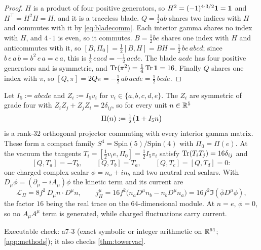 \begin{proof}
$H$ is a product of four positive generators, so $H^2=(-1)^{4\cdot3/2}\mathbf 1=\mathbf 1$ and $H^{\!\top}=H^2H=H$, and it is a traceless blade. $Q=\tfrac12ab$ shares two indices with
$H$ and commutes with it by \eqref{eq:bladecomm}. Each interior gamma shares no index with $H$, and $4\cdot1$ is even, so it commutes. $B=\tfrac12be$ shares one index with
$H$ and anticommutes with it, so $[B,\Pi_0]=\tfrac12[B,H]=BH=\tfrac12\,be\,abcd$; since $b\,e\,a\,b=b^2\,e\,a=e\,a$, this is $\tfrac12\,eacd=-\tfrac12\,acde$. The
blade $acde$ has four positive generators and is symmetric, and $\operatorname{Tr}(\pi^2)=\tfrac14\operatorname{Tr}\mathbf 1=16$. Finally $Q$ shares one index with $\pi$, so
$[Q,\pi]=2Q\pi=-\tfrac12\,ab\,acde=\tfrac12\,bcde$.
\end{proof}

\begin{theorem}
\label{thm:S4}
Let $I_5:=abcde$ and $Z_i:=I_5v_i$ for $v_i\in\{a,b,c,d,e\}$. The $Z_i$ are symmetric of grade four with $Z_iZ_j+Z_jZ_i=2\delta_{ij}$, so for every unit $n\in\mathbb{R}^5$
\[
\Pi(n):=\tfrac12\bigl(\mathbf 1+I_5n\bigr)
\]
is a rank-$32$ orthogonal projector commuting with every interior gamma matrix. These form a compact family $S^4=\mathrm{Spin}(5)/\mathrm{Spin}(4)$ with $\Pi_0=\Pi(e)$.
At the vacuum the tangents $T_i=[\tfrac12v_ie,\Pi_0]=\tfrac12I_5v_i$ satisfy $\operatorname{Tr}(T_iT_j)=16\delta_{ij}$ and
\[
[Q,T_a]=-T_b,\qquad [Q,T_b]=T_a,\qquad [Q,T_c]=[Q,T_d]=0 :
\]
one charged complex scalar $\phi=n_a+in_b$ and two neutral real scalars. With $D_\mu\phi=(\partial_\mu-iA_\mu)\phi$ the kinetic term and its current are
\[
\mathcal L_\Pi=8f^2\,D_\mu n\cdot D^\mu n,\qquad j^\mu_\Pi=16f^2\bigl(n_aD^\mu n_b-n_bD^\mu n_a\bigr)=16f^2\Im(\bar\phi D^\mu\phi),
\]
the factor $16$ being the real trace on the $64$-dimensional module. At $n=e$, $\phi=0$, so no $A_\mu A^\mu$ term is generated, while charged fluctuations carry current.
\end{theorem}

\noindent Executable check: a7-3 (exact symbolic or integer arithmetic on $\mathbb{R}^{64}$; \cref{app:methods}); it also checks \cref{thm:towervac}.


